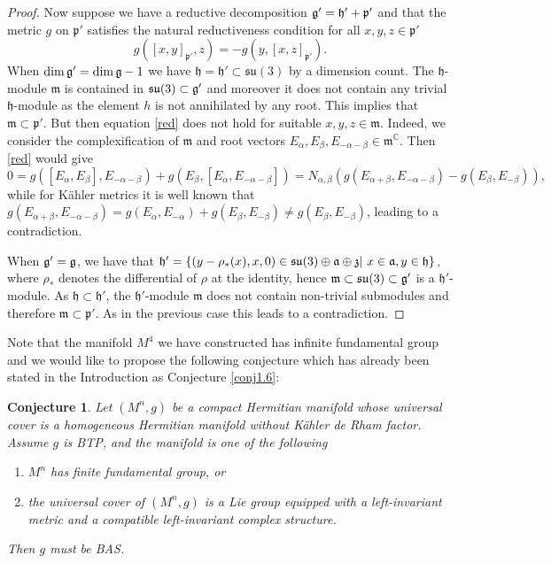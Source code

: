 \documentclass{amsart}
\numberwithin{equation}{section}
\newtheorem{conjecture}  [theorem]     {Conjecture}
\theoremstyle{definition}
\renewcommand{\1}{\mathds{1}}
\renewcommand{\a}{\alpha}
\renewcommand{\b}{\beta}
\newcommand{\ga}{\mathfrak a}
\newcommand{\gz}{\mathfrak z}
\newcommand{\gp}{\mathfrak p}
\newcommand{\gl}{\mathfrak l}
\newcommand{\gh}{\mathfrak h}
\newcommand{\gm}{\mathfrak m}
\newcommand{\gu}{\mathfrak u}
\newcommand{\SU}{\rm {SU}}
\renewcommand{\>}{\rightarrow}
\begin{document}
\begin{proof}
Now suppose we have  a reductive decomposition $\frak g' = \gh' +\gp'$ and that the metric $g$ on $\gp'$ satisfies the natural reductiveness condition for all $x,y,z\in\gp'$
\begin{equation}\label{red} g([x,y]_{\gp'},z) = - g(y,[x,z]_{\gp'}).\end{equation}
When $\dim \frak g' = \dim\frak g - 1$ we have $\gh=\gh'\subset \mathfrak {su}(3)$ by a dimension count. The $\gh$-module $\gm$ is contained in $\frak{su}(3)\subset \frak g'$ and moreover it does not contain any trivial $\gh$-module as the element $h$ is not annihilated by any root. This implies that $\gm\subset \gp'$.
But then equation \eqref{red} does not hold for suitable $x,y,z\in\gm$. Indeed, we consider the complexification of $\gm$ and root vectors $E_\a,E_\b,E_{-\a-\b}\in \gm^\mathbb C$. Then \eqref{red} would give
$$0 = g([E_\a,E_\b],E_{-\a-\b}) + g(E_\b,[E_\a,E_{-\a-\b}]) = N_{\a,\b}\left ( g(E_{\a+\b},E_{-\a-\b}) - g(E_\b,E_{-\b})\right),$$
while for K\"ahler metrics it is well known that $g(E_{\a+\b},E_{-\a-\b})= g(E_\a,E_{-\a})  + g(E_\b,E_{-\b})\neq g(E_\b,E_{-\b})$, leading to a contradiction.

When $\frak g' = \frak g$, we have that $\gh' = \{(y-\rho_*(x),x,0)\in \frak{su}(3)\oplus\ga\oplus\gz|\ x\in \ga, y\in\gh\}$, where $\rho_*$ denotes the differential of $\rho$ at the identity, hence $\gm\subset\frak{su}(3)\subset \frak g'$ is a $\gh'$-module. As $\gh\subset\gh'$, the $\gh'$-module $\gm$ does not contain non-trivial submodules and therefore $\gm\subset \gp'$. As in the previous case this leads to a contradiction. \end{proof}
Note that  the manifold $M^4$ we have constructed has infinite fundamental group and  we would like to propose the following conjecture which has already been stated in the Introduction as Conjecture \ref{conj1.6}:

\begin{conjecture} \label{conj5.2}
Let $(M^n,g)$ be a compact Hermitian manifold whose universal cover is a homogeneous Hermitian manifold without K\"ahler de Rham factor. Assume $g$ is {\rm BTP}, and the manifold is one of the following
\begin{enumerate}
\item $M^n$ has finite fundamental group, or
\item the universal cover of $(M^n,g)$ is a Lie group equipped with a left-invariant metric and a compatible left-invariant complex structure.
\end{enumerate}
Then $g$ must be {\rm BAS}.
\end{conjecture}
\end{document}
